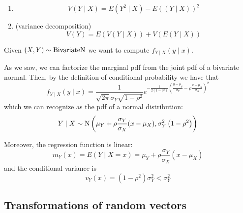 \documentclass[12pt]{extarticle}
\newcommand{\Normal}{{\operatorfont N}}
\newcommand{\BivariateNormal}{{\operatorfont BivariateN}}
\begin{document}
\begin{theorem}
    \skiplineafterproof
    \begin{enumerate}[label=\roman*.]
        \item \begin{equation}
                  V(Y \mid X) = E(Y^2  \mid  X) - E\left((Y \mid X)\right)^2
              \end{equation}

        \item (variance decomposition)
              \begin{equation}
                  V(Y) = E(V(Y \mid X)) + V(E(Y \mid X))
              \end{equation}
    \end{enumerate}
\end{theorem}

\begin{example}
    Given $(X, Y) \sim \BivariateNormal$ we want to compute $f_{Y \mid X}(y \mid x)$.

    As we saw, we can factorize the marginal pdf from the joint pdf of a bivariate normal.
    Then, by the definition of conditional probability we have that
    \begin{equation}
        f_{Y \mid X}(y \mid x) = \frac{1}{\sqrt{2 \pi} \sigma_Y \sqrt{1-\rho^2}} e^{-\frac{1}{2(1-\rho^2)}\left( \frac{y-\mu_y}{\sigma_Y} - \rho \frac{x-\mu_X}{\sigma_X} \right)^2}
    \end{equation}
    which we can recognize as the pdf of a normal distribution:
    \begin{equation}
        Y \mid X \sim \Normal\left(\mu_Y + \rho\frac{\sigma_Y}{\sigma_X}(x - \mu_X), \sigma_Y^2\left(1-\rho^2\right)\right)
    \end{equation}

    Moreover, the regression function is linear:
    \begin{equation}
        m_Y(x) = E(Y \mid X = x) = \mu_Y + \rho \frac{\sigma_Y}{\sigma_X} (x - \mu_X)
    \end{equation}
    and the conditional variance is
    \begin{equation}
        v_Y(x) = \left(1- \rho^2\right) \sigma_Y^2 < \sigma_Y^2
    \end{equation}
\end{example}

\subsection{Transformations of random vectors}
\end{document}

